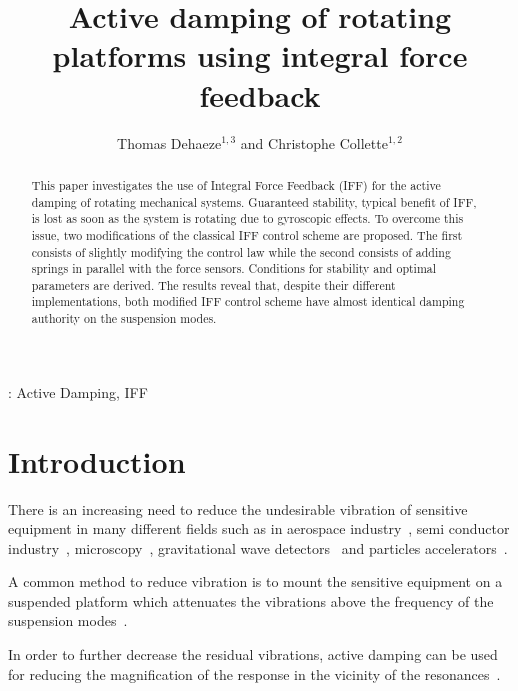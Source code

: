 \documentclass[10pt]{iopart}
\begin{document}
\title{Active damping of rotating platforms using integral force feedback}
\author{Thomas Dehaeze$^{1,3}$ and Christophe Collette$^{1,2}$}
\address{$^1$ Precision Mechatronics Laboratory, University of Liege, Belgium}
\address{$^2$ BEAMS Department, Free University of Brussels, Belgium}
\address{$^3$ European Synchrotron Radiation Facility, Grenoble, France}

\begin{abstract}
This paper investigates the use of Integral Force Feedback (IFF) for the active damping of rotating mechanical systems.
Guaranteed stability, typical benefit of IFF, is lost as soon as the system is rotating due to gyroscopic effects.
To overcome this issue, two modifications of the classical IFF control scheme are proposed.
The first consists of slightly modifying the control law while the second consists of adding springs in parallel with the force sensors.
Conditions for stability and optimal parameters are derived.
The results reveal that, despite their different implementations, both modified IFF control scheme have almost identical damping authority on the suspension modes.
\end{abstract}

\vspace{2pc}
: Active Damping, IFF

\maketitle
\ioptwocol

\section{Introduction}
\label{sec:org1def047}
\label{sec:introduction}
There is an increasing need to reduce the undesirable vibration of sensitive equipment in many different fields such as in aerospace industry~\cite{hanieh03_activ_stewar,hauge04_sensor_contr_space_based_six,souleille18_concep_activ_mount_space_applic}, semi conductor industry~\cite{yoshioka01_activ_microv_isolat_system_hi}, microscopy~\cite{lan08_activ_vibrat_isolat_long_range,fleming15_low_order_dampin_track_contr}, gravitational wave detectors~\cite{matichard15_seism_isolat_advan_ligo} and particles accelerators~\cite{collette10_activ_quadr_stabil_futur_linear_partic_collid,dehaeze18_sampl_stabil_for_tomog_exper}.

A common method to reduce vibration is to mount the sensitive equipment on a suspended platform which attenuates the vibrations above the frequency of the suspension modes~\cite{reilly06_critic,poel10_explor_activ_hard_mount_vibrat}. \par
In order to further decrease the residual vibrations, active damping can be used for reducing the magnification of the response in the vicinity of the resonances~\cite{collette11_review_activ_vibrat_isolat_strat}.
\end{document}
